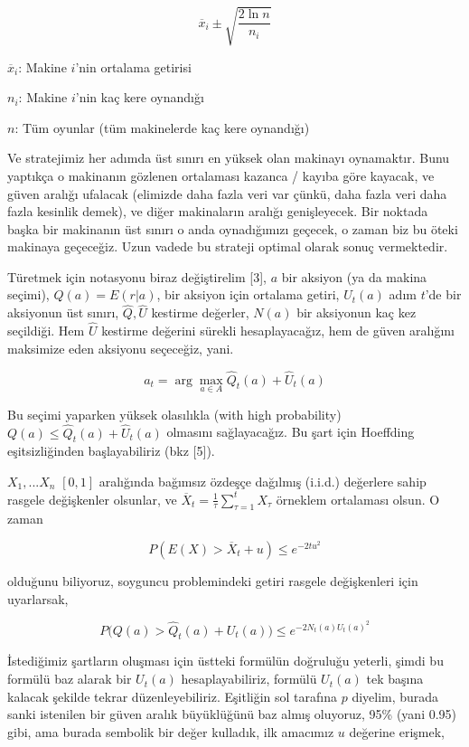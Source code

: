 \documentclass[12pt,fleqn]{article}\usepackage{../../common}
\begin{document}
$$ \overline{x}_i \pm \sqrt{\frac{2 \ln n}{n_i}} $$

$\overline{x}_i$: Makine $i$'nin ortalama getirisi

$n_i$: Makine $i$'nin kaç kere oynandığı

$n$: Tüm oyunlar (tüm makinelerde kaç kere oynandığı)

Ve stratejimiz her adımda üst sınırı en yüksek olan makinayı
oynamaktır. Bunu yaptıkça o makinanın gözlenen ortalaması kazanca / kayıba
göre kayacak, ve güven aralığı ufalacak (elimizde daha fazla veri var
çünkü, daha fazla veri daha fazla kesinlik demek), ve diğer makinaların
aralığı genişleyecek. Bir noktada başka bir makinanın üst sınırı o anda
oynadığımızı geçecek, o zaman biz bu öteki makinaya geçeceğiz. Uzun vadede
bu strateji optimal olarak sonuç vermektedir.

Türetmek için notasyonu biraz değiştirelim [3], $a$ bir aksiyon (ya da
makina seçimi), $Q(a) = E(r|a)$, bir aksiyon için ortalama getiri, $U_t(a)$
adım $t$'de bir aksiyonun üst sınırı, $\hat{Q}, \hat{U}$ kestirme değerler,
$N(a)$ bir aksiyonun kaç kez seçildiği. Hem $\hat{U}$ kestirme değerini
sürekli hesaplayacağız, hem de güven aralığını maksimize eden aksiyonu
seçeceğiz, yani.

$$ a_t = \arg \max_{a \in A} \hat{Q}_t(a) + \hat{U}_t(a) $$

Bu seçimi yaparken yüksek olasılıkla (with high probability)
$Q(a) \le \hat{Q}_t(a) + \hat{U}_t(a)$ olmasını sağlayacağız. Bu şart için
Hoeffding eşitsizliğinden başlayabiliriz (bkz [5]).

$X_1,...X_n$ $[0,1]$ aralığında bağımsız özdeşçe dağılmış (i.i.d.)
değerlere sahip rasgele değişkenler olsunlar, ve
$\overline{X}_t = \frac{1}{\tau} \sum_{\tau=1}^{t} X_\tau$ örneklem
ortalaması olsun. O zaman

$$ P(E(X) > \overline{X}_t + u ) \le e^{-2 t u^2}$$

olduğunu biliyoruz, soyguncu problemindeki getiri rasgele değişkenleri için
uyarlarsak,

$$ 
P \big( Q(a) > \hat{Q}_t(a) + U_t(a)  \big) \le 
e^{-2 N_t(a)U_t(a)^2 }
$$

İstediğimiz şartların oluşması için üstteki formülün doğruluğu yeterli,
şimdi bu formülü baz alarak bir $U_t(a)$ hesaplayabiliriz, formülü $U_t(a)$
tek başına kalacak şekilde tekrar düzenleyebiliriz. Eşitliğin sol tarafına
$p$ diyelim, burada sanki istenilen bir güven aralık büyüklüğünü baz almış
oluyoruz, 95\% (yani 0.95) gibi, ama burada sembolik bir değer kulladık,
ilk amacımız $u$ değerine erişmek,
\end{document}
